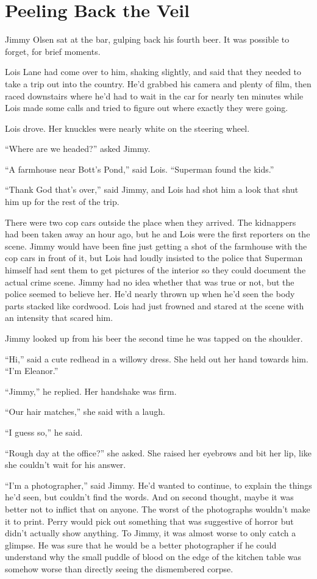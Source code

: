 \documentclass[ebook,12pt]{memoir}
\begin{document}
\chapter{Peeling Back the Veil}\label{peeling-back-the-veil}

Jimmy Olsen sat at the bar, gulping back his fourth beer. It was
possible to forget, for brief moments.

Lois Lane had come over to him, shaking slightly, and said that they
needed to take a trip out into the country. He'd grabbed his camera and
plenty of film, then raced downstairs where he'd had to wait in the car
for nearly ten minutes while Lois made some calls and tried to figure
out where exactly they were going.

Lois drove. Her knuckles were nearly white on the steering wheel.

``Where are we headed?'' asked Jimmy.

``A farmhouse near Bott's Pond,'' said Lois. ``Superman found the
kids.''

``Thank God that's over,'' said Jimmy, and Lois had shot him a look that
shut him up for the rest of the trip.

There were two cop cars outside the place when they arrived. The
kidnappers had been taken away an hour ago, but he and Lois were the
first reporters on the scene. Jimmy would have been fine just getting a
shot of the farmhouse with the cop cars in front of it, but Lois had
loudly insisted to the police that Superman himself had sent them to get
pictures of the interior so they could document the actual crime scene.
Jimmy had no idea whether that was true or not, but the police seemed to
believe her. He'd nearly thrown up when he'd seen the body parts stacked
like cordwood. Lois had just frowned and stared at the scene with an
intensity that scared him.

Jimmy looked up from his beer the second time he was tapped on the
shoulder.

``Hi,'' said a cute redhead in a willowy dress. She held out her hand
towards him. ``I'm Eleanor.''

``Jimmy,'' he replied. Her handshake was firm.

``Our hair matches,'' she said with a laugh.

``I guess so,'' he said.

``Rough day at the office?'' she asked. She raised her eyebrows and bit
her lip, like she couldn't wait for his answer.

``I'm a photographer,'' said Jimmy. He'd wanted to continue, to explain
the things he'd seen, but couldn't find the words. And on second
thought, maybe it was better not to inflict that on anyone. The worst of
the photographs wouldn't make it to print. Perry would pick out
something that was suggestive of horror but didn't actually show
anything. To Jimmy, it was almost worse to only catch a glimpse. He was
sure that he would be a better photographer if he could understand why
the small puddle of blood on the edge of the kitchen table was somehow
worse than directly seeing the dismembered corpse.
\end{document}
